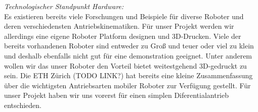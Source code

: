 \begin{flushleft}
    \textit{Technologischer Standpunkt Hardware:} \\
    Es existieren bereits viele Forschungen und Beispiele für diverse Roboter
    und deren verschiedensten Antriebskinematiken.
    Für unser Projekt werden wir allerdings eine eigene Roboter Platform designen und 3D-Drucken.
    Viele der bereits vorhandenen Roboter sind entweder zu Groß und teuer oder viel zu klein und deshalb ebenfalls nicht 
    gut für eine demonstration geeignet. Unter anderem wollen wir das unser Roboter den Vorteil bietet weitestgehend
    3D-gedruckt zu sein.
    Die ETH Zürich (TODO LINK?) hat bereits eine kleine Zusammenfassung über die wichtigsten Antriebsarten mobiler Roboter zur Verfügung gestellt.
    Für unser Projekt haben wir uns vorerst für einen simplen Diferentialantrieb entschieden. 
\end{flushleft}